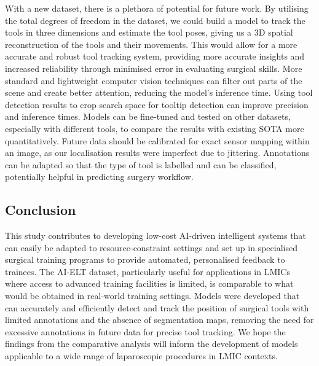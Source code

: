 With a new dataset, there is a plethora of potential for future work. By utilising the total degrees of freedom in the dataset, we could build a model to track the tools in three dimensions and estimate the tool poses, giving us a 3D spatial reconstruction of the tools and their movements. This would allow for a more accurate and robust tool tracking system, providing more accurate insights and increased reliability through minimised error in evaluating surgical skills. More standard and lightweight computer vision techniques can filter out parts of the scene and create better attention, reducing the model's inference time. Using tool detection results to crop search space for tooltip detection can improve precision and inference times. Models can be fine-tuned and tested on other datasets, especially with different tools, to compare the results with existing SOTA more quantitatively. Future data should be calibrated for exact sensor mapping within an image, as our localisation results were imperfect due to jittering. Annotations can be adapted so that the type of tool is labelled and can be classified, potentially helpful in predicting surgery workflow.

\subsection{Conclusion}
 
This study contributes to developing low-cost AI-driven intelligent systems that can easily be adapted to resource-constraint settings and set up in specialised surgical training programs to provide automated, personalised feedback to trainees. The AI-ELT dataset, particularly useful for applications in LMICs where access to advanced training facilities is limited, is comparable to what would be obtained in real-world training settings. Models were developed that can accurately and efficiently detect and track the position of surgical tools with limited annotations and the absence of segmentation maps, removing the need for excessive annotations in future data for precise tool tracking. We hope the findings from the comparative analysis will inform the development of models applicable to a wide range of laparoscopic procedures in LMIC contexts. 

